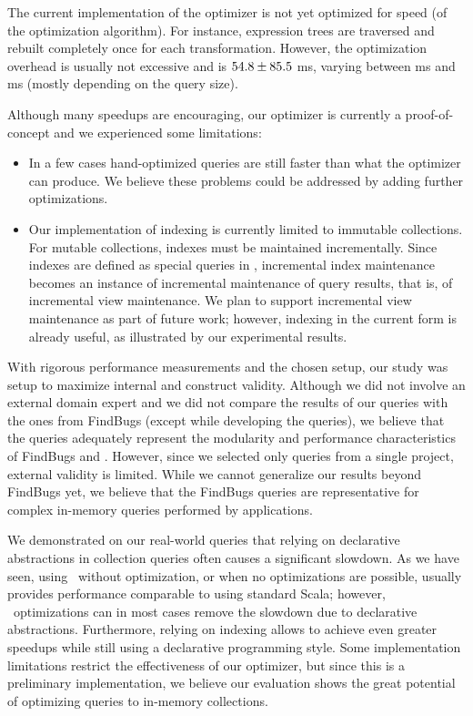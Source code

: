 The current implementation of the optimizer is not yet optimized for speed (of the optimization algorithm). For instance, expression trees are traversed and rebuilt completely once for each transformation.
However, the optimization overhead is usually not excessive and
is $54.8 \pm 85.5$ ms, varying between \minOptimTime{} ms and \maxOptimTime{} ms (mostly depending on the query size).

Although many speedups are encouraging, our optimizer is currently a proof-of-concept and we experienced some limitations:
\begin{itemize}
\item In a few cases hand-optimized queries are still faster than what the optimizer can produce. We believe these problems could be addressed by adding further optimizations.
\item Our implementation of indexing is currently limited to immutable collections. For mutable collections, indexes must be maintained incrementally.
Since indexes are defined as special queries in {\LoS},  incremental index maintenance becomes an instance of incremental maintenance of query results, that is, of incremental view maintenance. We plan to support incremental view maintenance as part of future work; however,
indexing in the current form is already useful, as illustrated by our experimental results.
\end{itemize}

With rigorous performance measurements and the chosen setup, our study was setup to maximize internal and construct validity. Although we did not involve an external domain expert and we did not compare the results of our queries with the ones from FindBugs (except while developing the queries), we believe that the queries adequately represent the modularity and performance characteristics of FindBugs and {\LoS}. However, since we selected only queries from a single project, external validity is limited.
While we cannot generalize our results beyond FindBugs yet, we believe that the FindBugs queries are representative for complex in-memory queries performed by applications.


We demonstrated on our real-world queries that relying on declarative abstractions in collection queries often causes a significant slowdown. As we have seen, using \LoS\ without optimization, or when no optimizations are possible, usually provides performance comparable to using standard Scala; however, \LoS\ optimizations can in most cases remove the slowdown due to declarative abstractions. Furthermore, relying on indexing allows to achieve even greater speedups while still using a declarative programming style.
Some implementation limitations restrict the effectiveness of our optimizer, but since this is a preliminary implementation, we believe our evaluation shows the great potential of optimizing queries to in-memory collections.


